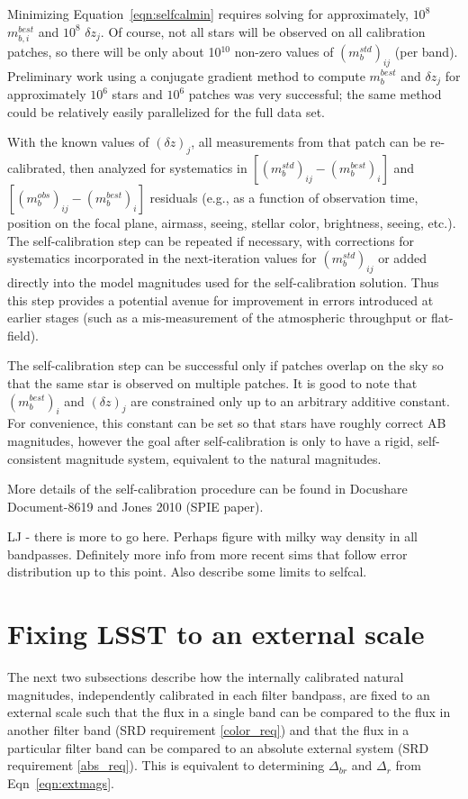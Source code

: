 \documentclass[12pt,preprint]{aastex}
\begin{document}
Minimizing Equation~\ref{eqn:selfcalmin} requires solving for
approximately, $10^8$ $m_{b,i}^{best}$ and $10^8$ $\delta z_j$. Of
course, not all stars will be observed on all calibration patches, so
there will be only about 10$^{10}$ non-zero values of
$(m_b^{std})_{ij}$ (per band). Preliminary work using a conjugate
gradient method to compute $m_{b}^{best}$ and $\delta z_j$ for
approximately $10^6$ stars and $10^6$ patches was very successful; the
same method could be relatively easily parallelized for the full data
set. 

With the known values of $(\delta z)_j$, all measurements from that
patch can be re-calibrated, then analyzed for systematics in
$[(m_b^{std})_{ij} - (m_b^{best})_{i}]$ and $[(m_b^{obs})_{ij} -
(m_b^{best})_{i}]$ residuals (e.g., as a function of observation time,
position on the focal plane, airmass, seeing, stellar color,
brightness, seeing, etc.). The self-calibration step can be repeated
if necessary, with corrections for systematics incorporated in the
next-iteration values for $(m_b^{std})_{ij}$ or added directly into
the model magnitudes used for the self-calibration solution. Thus this
step provides a potential avenue for improvement in errors introduced
at earlier stages (such as a mis-measurement of the atmospheric
throughput or flat-field). 

The self-calibration step can be successful only if patches
overlap on the sky so that the same star is observed on 
multiple patches. It is good to note that $(m_b^{best})_{i}$ and 
$(\delta z)_j$ are constrained only up to an arbitrary 
additive constant. For convenience, this constant can be set so that
stars have roughly correct AB magnitudes, however the goal after
self-calibration is only to have a rigid, self-consistent magnitude
system, equivalent to the natural magnitudes.

More details of the self-calibration procedure can be found in
Docushare Document-8619 and Jones 2010 (SPIE paper). 


LJ - there is more to go here. Perhaps figure with milky way density 
in all bandpasses.  Definitely more info from more recent sims
that follow error distribution up to this point. Also describe some 
limits to selfcal. 

\section{Fixing LSST to an external scale}
\label{sec:calib_external}

The next two subsections describe how the internally calibrated
natural magnitudes, independently calibrated in each filter bandpass, are fixed
to an external scale such that the flux in a single band can be compared to the
flux in another filter band (SRD requirement \ref{color_req}) and that
the flux in a particular filter band can be compared to an absolute
external system (SRD requirement \ref{abs_req}). This is equivalent to
determining $\Delta_{br}$ and $\Delta_r$ from Eqn~\ref{eqn:extmags}. 
\end{document}

